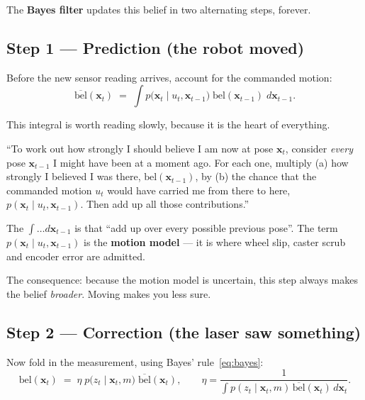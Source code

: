 \documentclass[11pt,a4paper]{report}
\newcommand{\term}[1]{\textcolor{rust}{\textbf{#1}}}
\newcommand{\xt}{\mathbf{x}}
\begin{document}
The \term{Bayes filter} updates this belief in two alternating steps, forever.

\subsection{Step 1 --- Prediction (the robot moved)}

Before the new sensor reading arrives, account for the commanded motion:
\begin{equation}
\overline{\mathrm{bel}}(\xt_t)
\;=\; \int p\bigl(\xt_t \mid u_t, \xt_{t-1}\bigr)\;
              \mathrm{bel}(\xt_{t-1})\; d\xt_{t-1} .
\label{eq:predict}
\end{equation}

This integral is worth reading slowly, because it is the heart of everything.

\begin{plain}
``To work out how strongly I should believe I am now at pose $\xt_t$, consider
\emph{every} pose $\xt_{t-1}$ I might have been at a moment ago. For each one,
multiply (a) how strongly I believed I was there,
$\mathrm{bel}(\xt_{t-1})$, by (b) the chance that the commanded motion $u_t$
would have carried me from there to here,
$p(\xt_t \mid u_t, \xt_{t-1})$. Then add up all those contributions.''

The $\int \ldots d\xt_{t-1}$ is that ``add up over every possible previous
pose''. The term $p(\xt_t \mid u_t, \xt_{t-1})$ is the \term{motion model} ---
it is where wheel slip, caster scrub and encoder error are admitted.

The consequence: because the motion model is uncertain, this step always makes
the belief \emph{broader}. Moving makes you less sure.
\end{plain}

\subsection{Step 2 --- Correction (the laser saw something)}

Now fold in the measurement, using Bayes' rule~\eqref{eq:bayes}:
\begin{equation}
\mathrm{bel}(\xt_t) \;=\; \eta \; p\bigl(z_t \mid \xt_t, m\bigr)\;
\overline{\mathrm{bel}}(\xt_t),
\qquad
\eta = \frac{1}{\displaystyle\int p(z_t \mid \xt_t, m)\,\overline{\mathrm{bel}}(\xt_t)\,d\xt_t}.
\label{eq:correct}
\end{equation}
\end{document}
